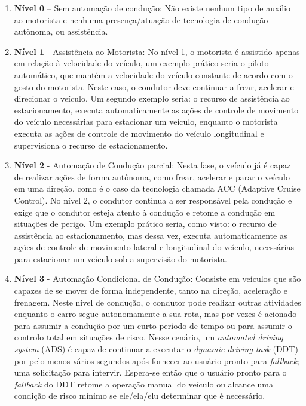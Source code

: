 \begin{enumerate} \label{SAE-level}
 \item \textbf{Nível 0} – Sem automação de condução: Não existe nenhum tipo de auxílio ao motorista e nenhuma presença/atuação de tecnologia de condução autônoma, ou assistência.

\item \textbf{Nível 1} - Assistência ao Motorista: No nível 1, o motorista é assistido apenas em relação à velocidade do veículo, um exemplo prático seria o piloto automático, que mantém a velocidade do veículo constante de acordo com o gosto do motorista. Neste caso, o condutor deve continuar a frear, acelerar e direcionar o veículo. Um segundo exemplo seria: o recurso de assistência ao estacionamento, executa automaticamente as ações de controle de movimento do veículo necessárias para estacionar um veículo, enquanto o motorista executa as ações de controle de movimento do veículo longitudinal e supervisiona o recurso de estacionamento.

\item \textbf{Nível 2} - Automação de Condução parcial: Nesta fase, o veículo já é capaz de realizar ações de forma autônoma, como frear, acelerar e parar o veículo em uma direção, como é o caso da tecnologia chamada ACC (Adaptive Cruise Control). No nível 2, o condutor continua a ser responsável pela condução e exige que o condutor esteja atento à condução e retome a condução em situações de perigo. Um exemplo prático seria, como visto: o recurso de assistência ao estacionamento, mas dessa vez, executa automaticamente as ações de controle de movimento lateral e longitudinal do veículo, necessárias para estacionar um veículo sob a supervisão do motorista.

\item \textbf{Nível 3} - Automação Condicional de Condução: Consiste em veículos que são capazes de se mover de forma independente, tanto na direção, aceleração e frenagem. Neste nível de condução, o condutor pode realizar outras atividades enquanto o carro segue autonomamente a sua rota, mas por vezes é acionado para assumir a condução por um curto período de tempo ou para assumir o controlo total em situações de risco. Nesse cenário, um \textit{automated driving system} (ADS)  é capaz de continuar a executar o \textit{dynamic driving task} (DDT) por pelo menos vários segundos após fornecer ao usuário pronto para \textit{fallback}; uma solicitação para intervir. Espera-se então que o usuário pronto para o \textit{fallback} do DDT retome a operação manual do veículo ou alcance uma condição de risco mínimo se ele/ela/elu determinar que é necessário.


\end{enumerate}
